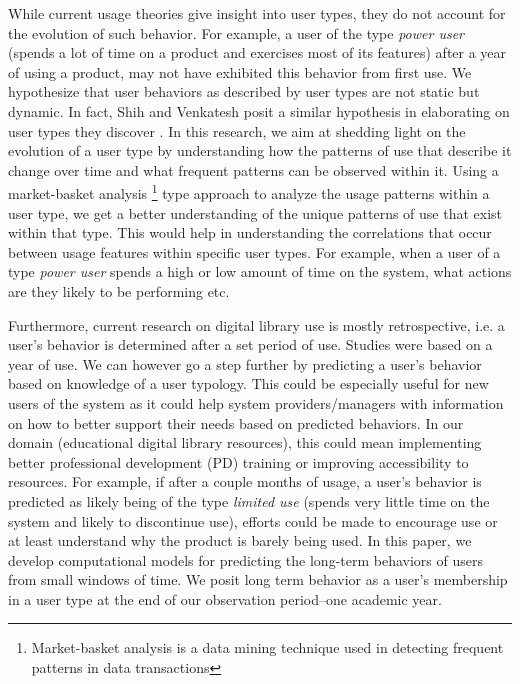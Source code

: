 \documentclass{acm_proc_article-sp}
\begin{document}
While current usage theories give insight into user types, they do not account for the evolution of such behavior. For example, a user of the type \textit{power user} (spends a lot of time on a product and exercises most of its features) after a year of using a product, may not have exhibited this behavior from first use. We hypothesize that user behaviors as described by user types are not static but dynamic. In fact, Shih and Venkatesh posit a similar hypothesis in elaborating on user types they discover \cite{shih2004beyond}. In this research, we aim at shedding light on the evolution of a user type by understanding how the patterns of use that describe it change over time and what frequent patterns can be observed within it. Using a market-basket analysis \footnote{Market-basket analysis is a data mining technique used in detecting frequent patterns in data transactions} type approach to analyze the usage patterns within a user type, we get a better understanding of the unique patterns of use that exist within that type. This would help in understanding the correlations that occur between usage features within specific user types. For example, when a user of a type \textit{power user} spends a high or low amount of time on the system, what actions are they likely to be performing etc.

Furthermore, current research on digital library use is mostly retrospective, i.e. a user's behavior is determined after a set period of use. Studies \cite{maullunderstanding,xu} were based on a year of use. We can however go a step further by predicting a user's behavior based on knowledge of a user typology. This could be especially useful for new users of the system as it could help system providers/managers with information on how to better support their needs based on predicted behaviors. In our domain (educational digital library resources), this could mean implementing better professional development (PD) training or improving accessibility to resources. For example, if after a couple months of usage, a user's behavior is predicted as likely being of the type \textit{limited use} (spends very little time on the system and likely to discontinue use), efforts could be made to encourage use or at least understand why the product is barely being used. In this paper, we develop computational models for predicting the long-term behaviors of users from small windows of time. We posit long term behavior as a user's membership in a user type at the end of our observation period--one academic year. 
\end{document}

